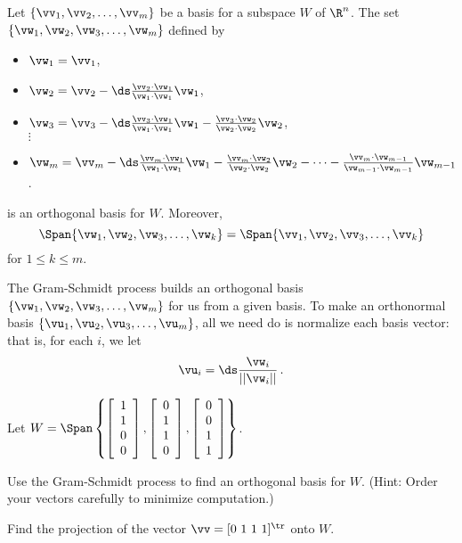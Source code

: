 \begin{theorem}\label{thm:6_d_Gram_Schmidt_ips} Let $\{\vv_1, \vv_2, \ldots, \vv_m\}$ be a basis for a subspace $W$ of $\R^n$. The set $\{\vw_1, \vw_2, \vw_3, \ldots, \vw_{m}\}$ defined by
\begin{itemize}
\item $\vw_1 = \vv_1$,
\item $\vw_2 = \vv_2 - \ds \frac{ \vv_2 \cdot  \vw_1 }{ \vw_1 \cdot  \vw_1 } \vw_1$,
\item $\vw_3 =  \vv_3 - \ds \frac{ \vv_3 \cdot  \vw_1 }{ \vw_1 \cdot  \vw_1 } \vw_1 - \frac{ \vv_3 \cdot  \vw_2 }{ \vw_2 \cdot  \vw_2 } \vw_2$, \\
\qquad $\vdots$
\item $\vw_m = \vv_m - \ds \frac{ \vv_m \cdot  \vw_1 }{ \vw_1 \cdot  \vw_1 } \vw_1 - \frac{ \vv_m \cdot  \vw_2 }{ \vw_2 \cdot  \vw_2 } \vw_2 - \cdots - \frac{ \vv_m \cdot  \vw_{m-1} }{ \vw_{m-1} \cdot  \vw_{m-1} } \vw_{m-1}$.
\end{itemize}
is an orthogonal basis for $W$. Moreover,
\[\Span\{\vw_1, \vw_2, \vw_3, \ldots, \vw_{k}\} = \Span\{\vv_1,\vv_2,\vv_3, \ldots, \vv_{k}\}\]
for $1\leq k\leq m$.
\end{theorem}


The Gram-Schmidt process builds an orthogonal basis $\{\vw_1, \vw_2, \vw_3, \ldots, \vw_{m}\}$ for us from a given basis. To make an orthonormal basis $\{\vu_1, \vu_2, \vu_3, \ldots, \vu_{m}\}$, all we need do is normalize each basis vector: that is, for each $i$, we let
\[\vu_i = \ds \frac{\vw_i}{|| \vw_i ||} \, .\]
 
\begin{activity} \label{act:6_d_gs_examples} Let $W = \Span \left\{\left[ \begin{array}{c} 1\\1\\0\\0 \end{array} \right], \left[ \begin{array}{c} 0\\1\\1\\0 \end{array} \right], \left[ \begin{array}{c} 0\\0\\1\\1 \end{array} \right] \right\}$. 
	\ba
	\item Use the Gram-Schmidt process to find an orthogonal basis for $W$. (Hint: Order your vectors carefully to minimize computation.)

\item Find the projection of the vector $\vv = [0 \ 1 \ 1 \ 1]^{\tr}$ onto $W$. 
	
	\ea
\end{activity}



